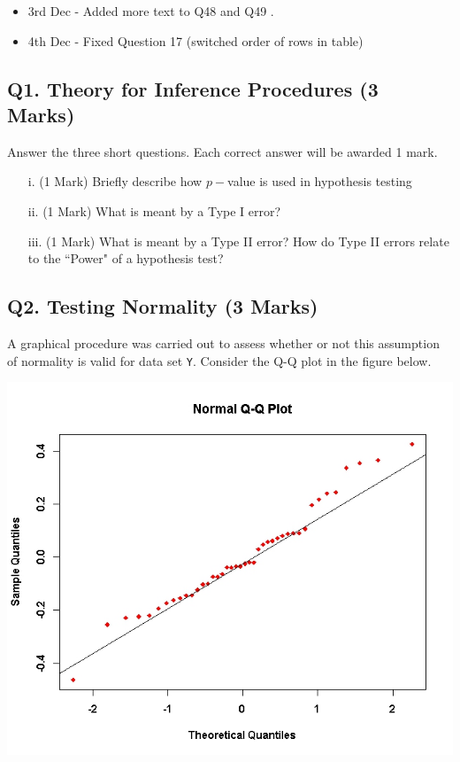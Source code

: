 \documentclass[a4paper,12pt]{article}
\begin{document}
\begin{itemize}
	\item 3rd Dec - Added more text to Q48 and Q49 .
	\item 4th Dec - Fixed Question 17 (switched order of rows in table)
\end{itemize}
\newpage
\subsection*{Q1. Theory for Inference Procedures (3 Marks)}
Answer the three short questions. Each correct answer will be awarded 1 mark.
\begin{itemize}
\item[i.] (1 Mark) Briefly describe how $p-$value is used in hypothesis testing
\item[ii.] (1 Mark) What is meant by a Type I error?
\item[iii.] (1 Mark) What is meant by a Type II error? How do Type II errors relate to the ``Power" of a hypothesis test?
\end{itemize}
%

\subsection*{Q2. Testing Normality (3 Marks)} %
A graphical procedure was carried out to assess whether or not this assumption of normality is valid for data set \texttt{Y}. Consider the Q-Q plot in the figure below.

\begin{center}
\includegraphics[scale=0.45]{images/ExamQ5qqplot}
\end{center}
\end{document}
